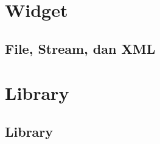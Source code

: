 \documentclass[11pt,b5paper,oneside,titlepage]{book}
\begin{document}
	\part{Widget}
	
	\chapter{File, Stream, dan XML}\label{file-stream-dan-xml}
		
		
%		
	\part{Library}
	\chapter{Library}\label{library}
	
	
	\backmatter
	
	
	\printindex
\end{document}
